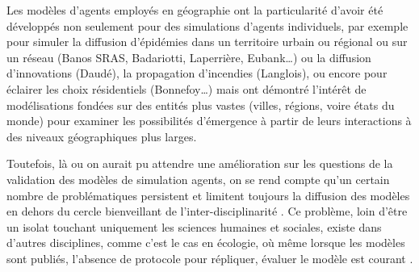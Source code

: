 {%

Les modèles d’agents employés en géographie ont la particularité d’avoir été développés non seulement pour des simulations d’agents individuels, par exemple pour simuler la diffusion d’épidémies dans un territoire urbain ou régional ou sur un réseau (Banos SRAS, Badariotti, Laperrière, Eubank…) ou la diffusion d’innovations (Daudé), la propagation d’incendies (Langlois), ou encore pour éclairer les choix résidentiels (Bonnefoy…) mais ont démontré l’intérêt de modélisations fondées sur des entités plus vastes (villes, régions, voire états du monde) pour examiner les possibilités d’émergence à partir de leurs interactions à des niveaux géographiques plus larges. 


Toutefois, là ou on aurait pu attendre une amélioration sur les questions de la validation des modèles de simulation agents, on se rend compte qu'un certain nombre de problématiques persistent et limitent toujours la diffusion des modèles en dehors du cercle bienveillant de l'inter-disciplinarité \autocite{Richiardi2006}. Ce problème, loin d'être un isolat touchant uniquement les sciences humaines et sociales, existe dans d'autres disciplines, comme c'est le cas en écologie, où même lorsque les modèles sont publiés, l'absence de protocole pour répliquer, évaluer le modèle est courant \autocite{Grimm1999}.

}
